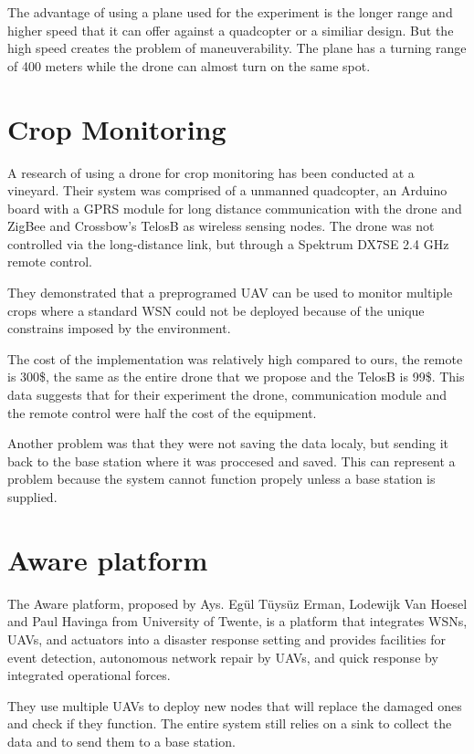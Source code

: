 The advantage of using a plane used for the experiment is the longer range and higher speed that it can offer against a quadcopter or a similiar design.  But the high speed creates the problem of maneuverability. The plane has a turning range of 400 meters while the drone can almost turn on the same spot.

\section{Crop Monitoring} \cite{valente2011air}

A research of using a drone for crop monitoring has been conducted at a vineyard. Their system was comprised of a unmanned quadcopter, an Arduino board with a GPRS module for long distance communication with  the drone and ZigBee and Crossbow’s TelosB as wireless sensing nodes. The drone was not controlled via the long-distance link, but through a Spektrum DX7SE 2.4 GHz remote control.

They demonstrated that a preprogramed UAV can be used to monitor multiple crops where a standard WSN could not be deployed because of the unique constrains imposed by the environment.

The cost of the implementation was relatively high compared to ours, the remote is 300\$, the same as the entire drone that we propose and the TelosB is 99\$. This data suggests that for their experiment the drone, communication module and the remote control were half the cost of the equipment.

Another problem was that they were not saving the data localy, but sending it back to the base station where it was proccesed and saved. This can represent a problem because the system cannot function propely unless a base station is supplied.

\section{Aware platform}\cite{ollero2007aware}

The Aware platform, proposed by Ays. Egül Tüysüz Erman, Lodewijk Van Hoesel and Paul Havinga from University of Twente, is a platform that integrates WSNs, UAVs, and actuators into a disaster response setting and provides facilities for event detection, autonomous network repair by UAVs, and quick response by integrated operational forces.

They use multiple UAVs to deploy new nodes that will replace the damaged ones and check if they function. The entire system still relies on a sink to collect the data and to send them to a base station.\cite{erman2008enabling}
